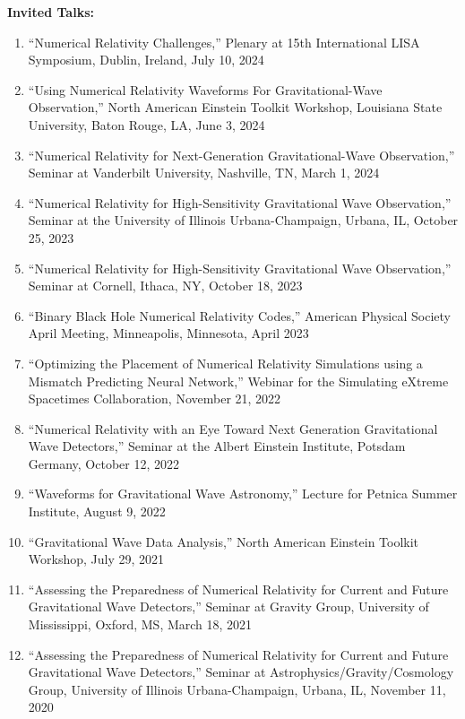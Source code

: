 \documentclass[11pt]{article}
\begin{document}
\begin{flushleft}
\textbf{Invited Talks:}
  \begin{enumerate}
  \item ``Numerical Relativity Challenges,'' Plenary at 15th International LISA Symposium, Dublin, Ireland, July 10, 2024
  \item ``Using Numerical Relativity Waveforms For Gravitational-Wave Observation,'' North American Einstein Toolkit Workshop, Louisiana State University, Baton Rouge, LA, June 3, 2024
  \item ``Numerical Relativity for Next-Generation Gravitational-Wave Observation,'' Seminar at Vanderbilt University, Nashville, TN, March 1, 2024
  \item ``Numerical Relativity for High-Sensitivity Gravitational Wave Observation,'' Seminar at the University of Illinois Urbana-Champaign, Urbana, IL, October 25, 2023
  \item ``Numerical Relativity for High-Sensitivity Gravitational Wave Observation,'' Seminar at Cornell, Ithaca, NY, October 18, 2023
  \item ``Binary Black Hole Numerical Relativity Codes,'' American Physical Society April Meeting, Minneapolis, Minnesota, April 2023
  \item ``Optimizing the Placement of Numerical Relativity Simulations using a Mismatch Predicting Neural Network,''  Webinar for the Simulating eXtreme Spacetimes Collaboration,  November 21, 2022
  \item ``Numerical Relativity with an Eye Toward Next Generation Gravitational Wave Detectors,'' Seminar at the Albert Einstein Institute, Potsdam Germany, October 12, 2022 
  \item ``Waveforms for Gravitational Wave Astronomy,'' Lecture for Petnica Summer Institute, August 9, 2022
  \item ``Gravitational Wave Data Analysis,'' North American Einstein Toolkit Workshop, July 29, 2021
  \item ``Assessing the Preparedness of Numerical Relativity for Current and Future Gravitational Wave Detectors,'' Seminar at Gravity Group, University of Mississippi, Oxford, MS, March 18, 2021
  \item ``Assessing the Preparedness of Numerical Relativity for Current and Future Gravitational Wave Detectors,'' Seminar at Astrophysics/Gravity/Cosmology Group, University of Illinois Urbana-Champaign, Urbana, IL, November 11, 2020
  \end{enumerate}


\end{flushleft}
\end{document}
